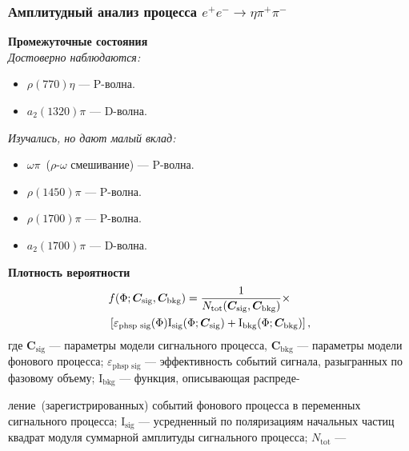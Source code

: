 \documentclass{beamer}
\begin{document}
\begin{frame}
  \frametitle{Амплитудный анализ процесса $e^+e^-\to\eta\pi^+\pi^-$}
  \begin{minipage}[t]{0.49\linewidth}
  \scriptsize
  \textbf{Промежуточные состояния}\\
  \textit{Достоверно наблюдаются:}
  \begin{itemize}
  \item {\scriptsize $\rho(770)\eta$ --- P-волна.} 
  \item {\scriptsize $a_2(1320)\pi$ --- D-волна.}
  \end{itemize}
  \textit{Изучались, но дают малый вклад:}
  \begin{itemize}
  \item {\scriptsize $\omega\pi$~($\rho$-$\omega$ смешивание) --- P-волна.}
  \item {\scriptsize $\rho(1450)\pi$ --- P-волна.}
  \item {\scriptsize $\rho(1700)\pi$ --- P-волна.}
  \item {\scriptsize $a_2(1700)\pi$ --- D-волна.}
  \end{itemize}
  \vspace{1em}%
  \textbf{Плотность вероятности}
  \vspace{-1em}%
   \begin{eqnarray*}
     \begin{split}
     \textstyle
       &f(\Phi; \bm{C}_{\text{sig}}, \bm{C}_{\text{bkg}}) =
     \frac{1}{N_{\text{tot}}(\bm{C}_{\text{sig}}, \bm{C}_{\text{bkg}})}\times\\
       &\left[ \varepsilon_{\text{phsp
    sig}}(\Phi)\text{I}_{\text{sig}}(\Phi; \bm{C}_{\text{sig}}) + \text{I}_{\text{bkg}}(\Phi;
         \bm{C}_{\text{bkg}}) \right],
     \end{split}
   \end{eqnarray*}
   где $\textstyle\bm{C}_{\text{sig}}$ --- параметры модели сигнального процесса,
   $\textstyle\bm{C}_{\text{bkg}}$ --- параметры модели фонового процесса;
   $\textstyle\varepsilon_{\text{phsp sig}}$ --- эффективность событий сигнала, разыгранных по
   фазовому объему; $\textstyle{}\text{I}_{\text{bkg}}$ --- функция, описывающая распреде-
\end{minipage}
\begin{minipage}[t]{0.49\linewidth}
  \scriptsize
  ление~(зарегистрированных) событий фонового процесса в переменных сигнального
  процесса; $\textstyle{}\text{I}_{\text{sig}}$ --- усредненный по поляризациям начальных частиц
  квадрат модуля суммарной амплитуды сигнального процесса; $\textstyle{}N_{\text{tot}}$ ---

\end{minipage}
\end{frame}
\end{document}
